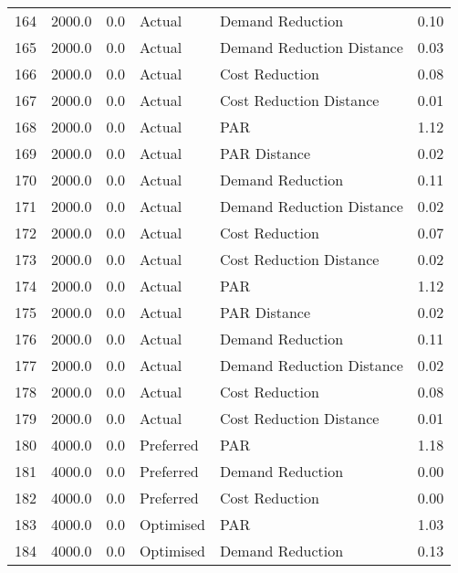 \begin{longtable}{lrrllr}
164  &       2000.0 &     0.0 &         Actual &           Demand Reduction &   0.10 \\
165  &       2000.0 &     0.0 &         Actual &  Demand Reduction Distance &   0.03 \\
166  &       2000.0 &     0.0 &         Actual &             Cost Reduction &   0.08 \\
167  &       2000.0 &     0.0 &         Actual &    Cost Reduction Distance &   0.01 \\
168  &       2000.0 &     0.0 &         Actual &                        PAR &   1.12 \\
169  &       2000.0 &     0.0 &         Actual &               PAR Distance &   0.02 \\
170  &       2000.0 &     0.0 &         Actual &           Demand Reduction &   0.11 \\
171  &       2000.0 &     0.0 &         Actual &  Demand Reduction Distance &   0.02 \\
172  &       2000.0 &     0.0 &         Actual &             Cost Reduction &   0.07 \\
173  &       2000.0 &     0.0 &         Actual &    Cost Reduction Distance &   0.02 \\
174  &       2000.0 &     0.0 &         Actual &                        PAR &   1.12 \\
175  &       2000.0 &     0.0 &         Actual &               PAR Distance &   0.02 \\
176  &       2000.0 &     0.0 &         Actual &           Demand Reduction &   0.11 \\
177  &       2000.0 &     0.0 &         Actual &  Demand Reduction Distance &   0.02 \\
178  &       2000.0 &     0.0 &         Actual &             Cost Reduction &   0.08 \\
179  &       2000.0 &     0.0 &         Actual &    Cost Reduction Distance &   0.01 \\
180  &       4000.0 &     0.0 &      Preferred &                        PAR &   1.18 \\
181  &       4000.0 &     0.0 &      Preferred &           Demand Reduction &   0.00 \\
182  &       4000.0 &     0.0 &      Preferred &             Cost Reduction &   0.00 \\
183  &       4000.0 &     0.0 &      Optimised &                        PAR &   1.03 \\
184  &       4000.0 &     0.0 &      Optimised &           Demand Reduction &   0.13 \\

\end{longtable}
